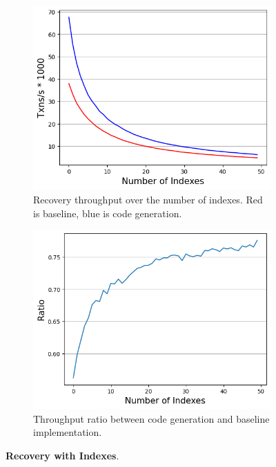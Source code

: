 \documentclass[12pt]{cmuthesis}
\begin{document}
\begin{figure}[t!]
\centering
\begin{subfigure}{.45\textwidth}
 \centering
 \includegraphics[width=1.0\textwidth]{images/IndexRecoveryThroughput.png}
 \caption{Recovery throughput over the number of indexes. Red is baseline, blue is code generation.}
  \label{fig:index_recovery_throughput}
\end{subfigure}
\begin{subfigure}{.45\textwidth}
 \centering
 \includegraphics[width=1.0\textwidth]{images/IndexRecoveryRatio.png}
 \caption{Throughput ratio between code generation and baseline implementation.}
  \label{fig:index_recovery_ratio}
\end{subfigure}
\caption{\textbf{Recovery with Indexes}.}
\label{fig:index_recovery_throughput}
\end{figure}
\end{document}
